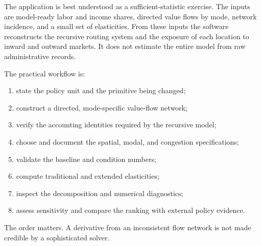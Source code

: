 The application is best understood as a sufficient-statistic exercise. The
inputs are model-ready labor and income shares, directed value flows by mode,
network incidence, and a small set of elasticities. From these inputs the
software reconstructs the recursive routing system and the exposure of each
location to inward and outward markets. It does not estimate the entire model
from raw administrative records.

The practical workflow is:
\begin{enumerate}
  \item state the policy unit and the primitive being changed;
  \item construct a directed, mode-specific value-flow network;
  \item verify the accounting identities required by the recursive model;
  \item choose and document the spatial, modal, and congestion
  specifications;
  \item validate the baseline and condition numbers;
  \item compute traditional and extended elasticities;
  \item inspect the decomposition and numerical diagnostics;
  \item assess sensitivity and compare the ranking with external policy
  evidence.
\end{enumerate}

The order matters. A derivative from an inconsistent flow network is not made
credible by a sophisticated solver.
